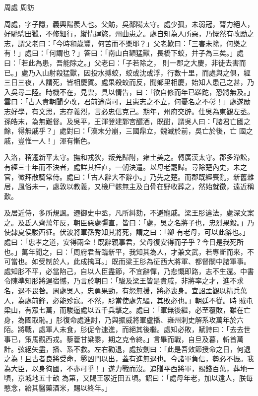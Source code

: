 
\begin{pinyinscope}
周處
 周訪



 周處，字子隱，義興陽羨人也。父魴，吳鄱陽太守。處少孤，未弱冠，膂力絕人，好馳騁田獵，不修細行，縱情肆慾，州曲患之。處自知為人所惡，乃慨然有改勵之志，謂父老曰：「今時和歲豐，何苦而不樂耶？」父老歎曰：「三害未除，何樂之有！」處曰：「何謂也？」答曰：「南山白額猛獸，長橋下蛟，并子為三矣。」處曰：「若此為患，吾能除之。」父老曰：「子若除之，
 則一郡之大慶，非徒去害而已。」處乃入山射殺猛獸，因投水搏蛟，蛟或沈或浮，行數十里，而處與之俱，經三日三夜，人謂死，皆相慶賀。處果殺蛟而反，聞鄉里相慶，始知人患己之甚，乃入吳尋二陸。時機不在，見雲，具以情告，曰：「欲自修而年已蹉跎，恐將無及。」雲曰：「古人貴朝聞夕改，君前途尚可，且患志之不立，何憂名之不彰！」處遂勵志好學，有文思，志存義烈，言必忠信克己。期年，州府交辟。仕吳為東觀左丞。孫皓末，為無難督。及吳平，王渾登建鄴宮釃酒，既酣，謂吳人曰：「諸君亡國之餘，得無戚乎？」處對曰：「漢末分崩，三國鼎立，魏滅於前，吳亡於後，亡
 國之戚，豈惟一人！」渾有慚色。



 入洛，稍遷新平太守。撫和戎狄，叛羌歸附，雍土美之。轉廣漢太守。郡多滯訟，有經三十年而不決者，處詳其枉直，一朝決遣。以母老罷歸。尋除楚內史，未之官，徵拜散騎常侍。處曰：「古人辭大不辭小。」乃先之楚。而郡既經喪亂，新舊雜居，風俗未一，處敦以教義，又檢尸骸無主及白骨在野收葬之，然始就徵，遠近稱歎。



 及居近侍，多所規諷。遷御史中丞，凡所糾劾，不避寵戚。梁王肜違法，處深文案之。及氐人齊萬年反，朝臣惡處彊直，皆曰：「處，吳之名將子也，忠烈果毅。」乃使隸夏侯駿西征。伏波將軍孫秀知其將死，謂之曰：「卿
 有老母，可以此辭也。」處曰：「忠孝之道，安得兩全！既辭親事君，父母復安得而子乎？今日是我死所也。」萬年聞之，曰：「周府君昔臨新平，我知其為人，才兼文武，若專斷而來，不可當也。如受制於人，此成擒耳。」既而梁王肜為征西大將軍、都督關中諸軍事。處知肜不平，必當陷己，自以人臣盡節，不宜辭憚，乃悲慨即路，志不生還。中書令陳準知肜將逞宿憾，乃言於朝曰：「駿及梁王皆是貴戚，非將率之才，進不求名，退不畏咎。周處吳人，忠勇果勁，有怨無援，將必喪身。宜詔孟觀以精兵萬人，為處前鋒，必能殄寇。不然，肜當使處先驅，其敗必也。」朝廷不從。時
 賊屯梁山，有眾七萬，而駿逼處以五千兵擊之。處曰：「軍無後繼，必至覆敗，雖在亡身，為國取恥。」肜復命處進討，乃與振威將軍盧播、雍州刺史解系攻萬年於六陌。將戰，處軍人未食，肜促令速進，而絕其後繼。處知必敗，賦詩曰：「去去世事已，策馬觀西戎。藜藿甘粱黍，期之克令終。」言畢而戰，自旦及暮，斬首萬計。弦絕矢盡，播、系不救。左右勸退，處按劍曰：「此是吾效節授命之日，何退之為！且古者良將受命，鑿凶門以出，蓋有進無退也。今諸軍負信，勢必不振。我為大臣，以身徇國，不亦可乎！」遂力戰而沒。追贈平西將軍，賜錢百萬，葬地一頃，京城地五十畝
 為第，又賜王家近田五頃。詔曰：「處母年老，加以遠人，朕每愍念，給其醫藥酒米，賜以終年。」




\end{pinyinscope}

